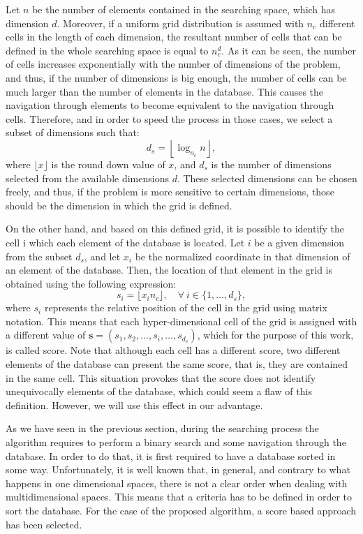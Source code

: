 \documentclass[preprint,12pt]{elsarticle}
\begin{document}
Let $n$ be the number of elements contained in the searching space, which has dimension $d$. Moreover, if a uniform grid distribution is assumed with $n_c$ different cells in the length of each dimension, the resultant number of cells that can be defined in the whole searching space is equal to $n_c^d$. As it can be seen, the number of cells increases exponentially with the number of dimensions of the problem, and thus, if the number of dimensions is big enough, the number of cells can be much larger than the number of elements in the database. This causes the navigation through elements to become equivalent to the navigation through cells. Therefore, and in order to speed the process in those cases, we select a subset of dimensions such that:
\begin{equation}
d_s = \left\lfloor\log_{n_c}n\right\rfloor,
\end{equation}
where $\lfloor x \rfloor$ is the round down value of $x$, and $d_s$ is the number of dimensions selected from the available dimensions $d$. These selected dimensions can be chosen freely, and thus, if the problem is more sensitive to certain dimensions, those should be the dimension in which the grid is defined. 

On the other hand, and based on this defined grid, it is possible to identify the cell i which each element of the database is located. Let $i$ be a given dimension from the subset $d_s$, and let $x_i$ be the normalized coordinate in that dimension of an element of the database. Then, the location of that element in the grid is obtained using the following expression:
\begin{equation}
s_i = \lfloor x_i n_c \rfloor, \quad \forall \: i\in\{1,\dots,d_s\},
\end{equation}
where $s_i$ represents the relative position of the cell in the grid using matrix notation. This means that each hyper-dimensional cell of the grid is assigned with a different value of $\mathbf{s} = (s_1, s_2, \dots, s_i, \dots, s_{d_s})$, which for the purpose of this work, is called score. Note that although each cell has a different score, two different elements of the database can present the same score, that is, they are contained in the same cell. This situation provokes that the score does not identify unequivocally elements of the database, which could seem a flaw of this definition. However, we will use this effect in our advantage.   

As we have seen in the previous section, during the searching process the algorithm requires to perform a binary search and some navigation through the database. In order to do that, it is first required to have a database sorted in some way. Unfortunately, it is well known that, in general, and contrary to what happens in one dimensional spaces, there is not a clear order when dealing with multidimensional spaces. This means that a criteria has to be defined in order to sort the database. For the case of the proposed algorithm, a score based approach has been selected. 
\end{document}
